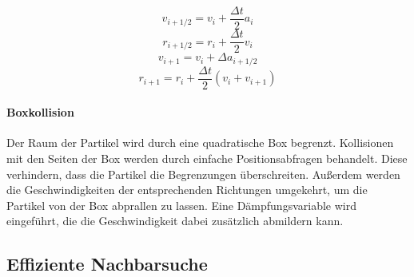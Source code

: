 \documentclass[a4paper]{paper}
\renewcommand{\eqref}[1]{Eq.~(\ref{#1})}
\begin{document}

\begin{equation}
\label{leapfrog_v_i+1/2}
v_{i+1/2} = v_{i}+\frac{\Delta t}{2}a_{i}
\end{equation}
\begin{equation}
\label{leapfrog_r_i+1/2}
r_{i+1/2} = r_{i}+\frac{\Delta t}{2}v_{i}
\end{equation}
\begin{equation}
\label{leapfrog_v_i+1}
v_{i+1} = v_{i} + \Delta a_{i+1/2}
\end{equation}
\begin{equation}
\label{leapfrog_r_i+1}
r_{i+1} = r_{i} + \frac{\Delta t}{2} (v_{i} + v_{i+1})
\end{equation}

\paragraph{Boxkollision} Der Raum der Partikel wird durch eine quadratische Box begrenzt. Kollisionen mit den Seiten der Box werden durch einfache Positionsabfragen behandelt. Diese verhindern, dass die Partikel die Begrenzungen überschreiten. Außerdem werden die Geschwindigkeiten der entsprechenden Richtungen umgekehrt, um die Partikel von der Box abprallen zu lassen. Eine Dämpfungsvariable wird eingeführt, die die Geschwindigkeit dabei zusätzlich abmildern kann.

\subsection{Effiziente Nachbarsuche}
\end{document}
